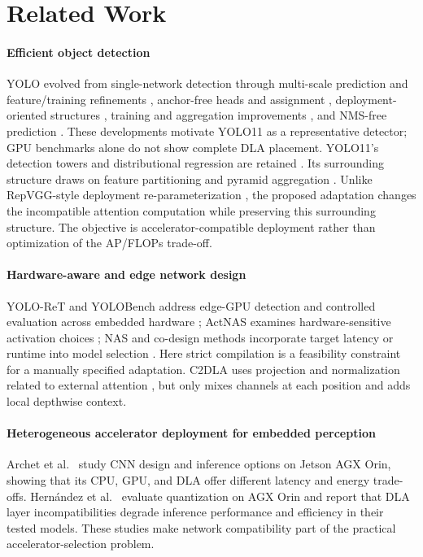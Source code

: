 \section{Related Work}
\label{sec:related}
\paragraph*{Efficient object detection}

YOLO evolved from single-network detection \cite{redmon2016yolo} through
multi-scale prediction and feature/training refinements
\cite{redmon2018yolov3,bochkovskiy2020yolov4}, anchor-free heads and assignment
\cite{ge2021yolox}, deployment-oriented structures \cite{li2022yolov6},
training and aggregation improvements \cite{wang2023yolov7,wang2024yolov9},
and NMS-free prediction \cite{wang2024yolov10}. These developments motivate
YOLO11 as a representative detector; GPU benchmarks alone do not show
complete DLA placement. YOLO11's detection towers and distributional
regression are retained \cite{jocher2024yolo11,li2020gfl}. Its surrounding
structure draws on feature partitioning and pyramid aggregation
\cite{wang2020cspnet,lin2017fpn,liu2018panet}. Unlike RepVGG-style deployment
re-parameterization \cite{ding2021repvgg,li2022yolov6}, the proposed adaptation changes
the incompatible attention computation while preserving this surrounding
structure. The objective is accelerator-compatible deployment rather than
optimization of the AP/FLOPs trade-off.

\paragraph*{Hardware-aware and edge network design}

YOLO-ReT and YOLOBench address edge-GPU detection and controlled evaluation
across embedded hardware \cite{ganesh2022yoloret,lazarevich2023yolobench};
ActNAS examines hardware-sensitive activation choices \cite{sah2025actnas};
NAS and co-design methods incorporate target latency or runtime into model
selection \cite{tan2019mnasnet,cai2019proxyless,cai2020ofa,lin2020mcunet}.
Here strict compilation is a feasibility constraint for a manually specified
adaptation. C2DLA uses projection and normalization related to external attention
\cite{guo2023external}, but only mixes channels at each position and adds local
depthwise context.

\paragraph*{Heterogeneous accelerator deployment for embedded perception}
Archet et al.\ \cite{archet2023energy} study CNN design and inference options
on Jetson AGX Orin, showing that its CPU, GPU, and DLA offer different latency
and energy trade-offs. Hern\'andez et al.\ \cite{hernandez2024optimizing}
evaluate quantization on AGX Orin and report that DLA layer incompatibilities
degrade inference performance and efficiency in their tested models.
These studies make network compatibility part of the practical
accelerator-selection problem.

